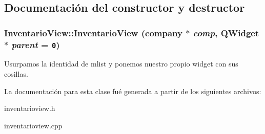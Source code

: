 \subsection{Documentaci\'{o}n del constructor y destructor}
\subsubsection{\setlength{\rightskip}{0pt plus 5cm}Inventario\-View::Inventario\-View ({\bf company} $\ast$ {\em comp}, QWidget $\ast$ {\em parent} = {\tt 0})}\label{classInventarioView_a0}


Usurpamos la identidad de mlist y ponemos nuestro propio widget con sus cosillas. 

La documentaci\'{o}n para esta clase fu\'{e} generada a partir de los siguientes archivos:\begin{CompactItemize}
\item 
inventarioview.h\item 
inventarioview.cpp\end{CompactItemize}
